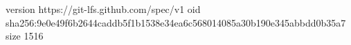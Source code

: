 version https://git-lfs.github.com/spec/v1
oid sha256:9e0e49f6b2644caddb5f1b1538e34ea6c568014085a30b190e345abbdd0b35a7
size 1516
